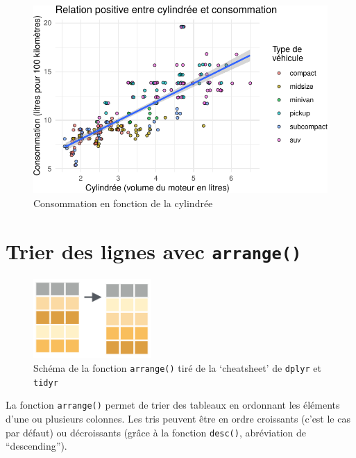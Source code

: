 \documentclass[
  a4paper,
  DIV=11,
  numbers=noendperiod,
  oneside]{scrreprt}
\begin{document}
\begin{figure}[H]

{\centering \includegraphics{04-DataWrangling_files/figure-pdf/consommation2-1.pdf}

}

\caption{Consommation en fonction de la cylindrée}

\end{figure}%

\section{\texorpdfstring{Trier des lignes avec
\texttt{arrange()}}{Trier des lignes avec arrange()}}\label{arrange}

\begin{figure}[H]

{\centering \includegraphics[width=0.4\textwidth,height=\textheight]{images/arrange.png}

}

\caption{Schéma de la fonction \texttt{arrange()} tiré de la
`cheatsheet' de \texttt{dplyr} et \texttt{tidyr}}

\end{figure}%

La fonction \texttt{arrange()} permet de trier des tableaux en ordonnant
les éléments d'une ou plusieurs colonnes. Les tris peuvent être en ordre
croissants (c'est le cas par défaut) ou décroissants (grâce à la
fonction \texttt{desc()}, abréviation de ``descending'').
\end{document}
